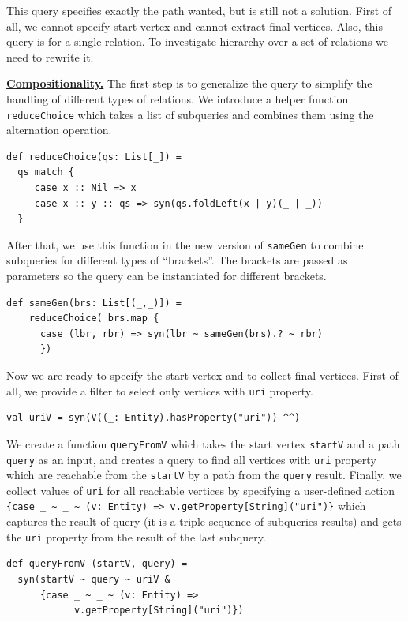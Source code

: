 This query specifies exactly the path wanted, but is still not a solution.
First of all, we cannot specify start vertex and cannot extract final vertices.
Also, this query is for a single relation.
To investigate hierarchy over a set of relations we need to rewrite it.

\underline{\textbf{Compositionality.}}
The first step is to generalize the query to simplify the handling of different types of relations.
We introduce a helper function \verb|reduceChoice| which takes a list of subqueries and combines them using the alternation operation.

\begin{lstlisting}
def reduceChoice(qs: List[_]) =
  qs match {
     case x :: Nil => x
     case x :: y :: qs => syn(qs.foldLeft(x | y)(_ | _))
  }
\end{lstlisting}

After that, we use this function in the new version of \verb|sameGen| to combine subqueries for different types of ``brackets''.
The brackets are passed as parameters so the query can be instantiated for different brackets.

\begin{lstlisting}
def sameGen(brs: List[(_,_)]) =
    reduceChoice( brs.map {
      case (lbr, rbr) => syn(lbr ~ sameGen(brs).? ~ rbr)
      })
\end{lstlisting}

Now we are ready to specify the start vertex and to collect final vertices.
First of all, we provide a filter to select only vertices with \verb|uri| property.

\begin{lstlisting}
val uriV = syn(V((_: Entity).hasProperty("uri")) ^^)
\end{lstlisting}

We create a function \verb|queryFromV| which takes the start vertex \verb|startV| and a path \verb|query| as an input, and creates a query to find all vertices with \verb|uri| property which are reachable from the \verb|startV| by a path from the \verb|query| result.
Finally, we collect values of \verb|uri| for all reachable vertices by specifying a user-defined action {\small \verb|{case _ ~ _ ~ (v: Entity) => v.getProperty[String]("uri")}|} which captures the result of query (it is a triple-sequence of subqueries results) and gets the \verb|uri| property from the result of the last subquery.

\begin{lstlisting}
def queryFromV (startV, query) =
  syn(startV ~ query ~ uriV &
      {case _ ~ _ ~ (v: Entity) =>
            v.getProperty[String]("uri")})
\end{lstlisting}


